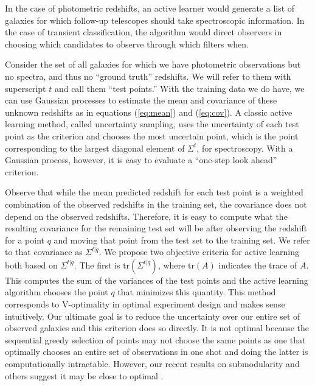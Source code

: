 \documentclass[prd, nofootinbib, floatfix, 12pt,tightenlines]{revtex4}
\begin{document}
In the case of photometric redshifts, an active learner would
generate a list of galaxies for which follow-up telescopes
should take spectroscopic information.  In the case of transient
classification, the algorithm would direct observers in choosing which
candidates to observe through which filters when.

Consider the set of all galaxies for which we have photometric observations
but no spectra, and thus no ``ground truth'' redshifts.  We will refer to
them with superscript $t$ and call them ``test points.'' With the training
data we do have, we can use Gaussian processes to estimate the mean and
covariance of these unknown redshifts as in equations (\ref{eq:mean}) and
(\ref{eq:cov}).  A classic active learning method, called uncertainty
sampling, uses the uncertainty of each test point as the criterion and
chooses the most uncertain point, which is the point corresponding to the
largest diagonal element of $\Sigma^{t}$, for spectroscopy.  With a Gaussian process,
however, it is easy to evaluate a ``one-step look ahead'' criterion.

Observe that while the mean predicted redshift for each test point is a
weighted combination of the observed redshifts in the training set, the
covariance does not depend on the observed redshifts.  Therefore, it is
easy to compute what the resulting covariance for the remaining test set
will be after observing the redshift for a point $q$ and moving that point
from the test set to the training set.  We refer to that covariance as
$\Sigma^{t|q}$.  We propose two objective criteria for active learning both
based on $\Sigma^{t|q}$.  The first is $\text{tr}(\Sigma^{t|q})$, where
$\text{tr}(A)$ indicates the trace of $A$.  This computes the sum of the
variances of the test points and the active learning algorithm chooses the
point $q$ that minimizes this quantity.  This method corresponds to
V-optimality in optimal experiment design and makes sense intuitively.  Our
ultimate goal is to reduce the uncertainty over our entire set of observed
galaxies and this criterion does so directly.  It is not optimal because
the sequential greedy selection of points may not choose the same points as
one that optimally chooses an entire set of observations in one shot and
doing the latter is computationally intractable.  However, our recent
results on submodularity and others suggest it may be close to optimal
\cite{YifeiMa12}.
\end{document}
